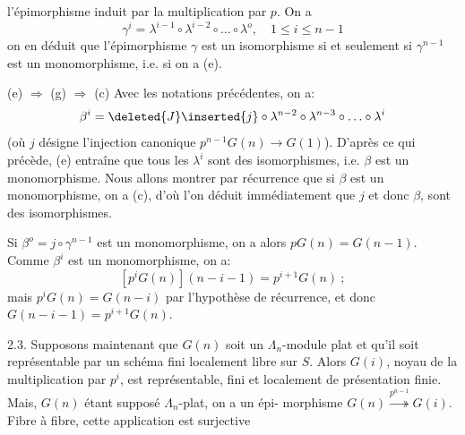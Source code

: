 
l'épimorphisme induit par la multiplication par $p$. On a
\[ \gamma^{i} = \lambda^{i-1} \circ \lambda^{i-2} \circ \ldots \circ \lambda^{o}, \quad 1 \leq i \leq n-1 \]
on en déduit que l'épimorphisme $\gamma$ est un isomorphisme si et seulement
si $\gamma^{n-1}$ est un monomorphisme, i.e. si on a (e).

(e) $\Rightarrow$ (g) $\Rightarrow$ (c) Avec les notations précédentes, on a:
\[ \beta^{i} = \deleted{J}\inserted{j} \circ \lambda^{n-2} \circ \lambda^{n-3} \circ \ldots \circ \lambda^{i} \] 
(où $j$ désigne l'injection canonique $p^{n-1}G(n) \rightarrow G(1)$). D'après ce qui
précède, (e) entraîne que tous les $\lambda^{i}$ sont des isomorphismes, i.e.
$\beta$ est un monomorphisme. Nous allons montrer par récurrence que si $\beta$ est
un monomorphisme, on a (c), d'où l'on déduit immédiatement que $j$ et donc
$\beta$, sont des isomorphismes.

Si $\beta^{o} = j\circ\gamma^{n-1}$ est un monomorphisme, on a alors $pG(n) = G(n-1)$.
Comme $\beta^{i}$ est un monomorphisme, on a:
\[ [p^{i}G(n)](n-i-1) = p^{i+1}G(n) \ ; \]
mais $p^{i}G(n) = G(n-i)$ par l'hypothèse de récurrence, et donc
$G(n-i-1) = p^{i+1}G(n)$.

2.3. Supposons maintenant que $G(n)$ soit un $\Lambda_{n}$-module plat et qu'il
soit représentable par un schéma fini localement libre sur $S$. Alors $G(i)$,
noyau de la multiplication par $p^{i}$, est représentable, fini et localement
de présentation finie. Mais, $G(n)$ étant supposé $\Lambda_{n}$-plat, on a un épi-%
morphisme $G(n) \overset{p^{n-1}}{\twoheadrightarrow} G(i)$. Fibre à fibre, cette application est surjective

